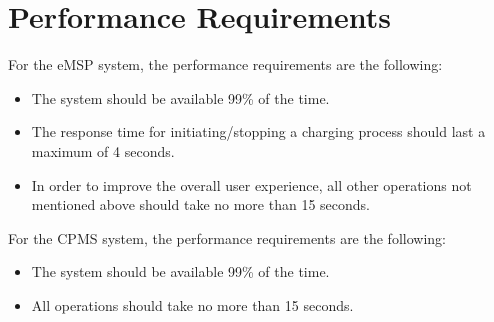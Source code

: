\begin{comment}
    \hline
    \textbf{FRE\row} & & & & & & & & & & & & & \T\B\\
    \hline
    \textbf{FRE\row} & & & & & & & & & & & & & \T\B\\
    \hline
    \textbf{FRE\row} & & & & & & & & & & & & & \T\B\\
    \hhline{==============}
    \textbf{FRE\row} & & & & & & & & & & & & & \T\B\\
    \hline
    \textbf{FRE\row} & & & & & & & & & & & & & \T\B\\
    \hline
    \textbf{FRE\row} & & & & & & & & & & & & & \T\B\\
    \hline
    \textbf{FRE\row} & & & & & & & & & & & & & \T\B\\
    \hline
    \textbf{FRE\row} & & & & & & & & & & & & & \T\B\\
    \hline
    \textbf{FRE\row} & & & & & & & & & & & & & \T\B\\
    \hline
    \textbf{FRE\row} & & & & & & & & & & & & & \T\B\\
    \hline
    \textbf{FRE\row} & & & & & & & & & & & & & \T\B\\
    \hline
    \textbf{FRE\row} & & & & & & & & & & & & & \T\B\\
    \hline
    \textbf{FRE\row} & & & & & & & & & & & & & \T\B\\
    \hline
    \textbf{FRE\row} & & & & & & & & & & & & & \T\B\\
    \hline
    \caption{Mapping of Use Cases on Requirements}
    \setcounter{row}{0}
\end{longtable}
\end{comment}
\newpage
\section{Performance Requirements}
\label{sec:performanceRequirements}
For the eMSP system, the performance requirements are the following:
\begin{itemize}
    \item The system should be available 99\% of the time.
    \item The response time for initiating/stopping a charging process should last a maximum of 4 seconds.
    \item In order to improve the overall user experience, all other operations not mentioned above should take no more than 15 seconds. \\
\end{itemize}    
For the CPMS system, the performance requirements are the following:
\begin{itemize}
    \item The system should be available 99\% of the time.
    \item All operations should take no more than 15 seconds.
\end{itemize}  

